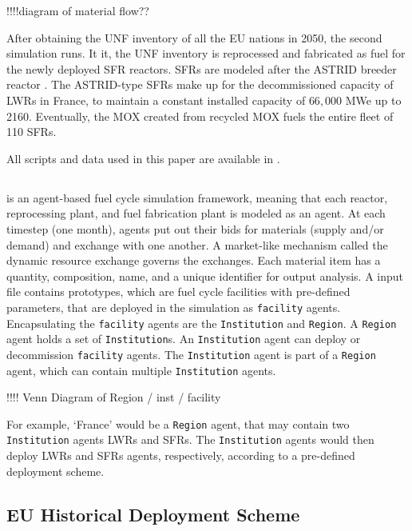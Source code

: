 !!!!diagram of material flow??

After obtaining the \gls{UNF} inventory of all the \gls{EU} nations in 2050, the second
simulation runs. It it, the \gls{UNF} inventory is reprocessed and fabricated
as fuel for the newly deployed \gls{SFR} reactors.
\glspl{SFR} are modeled after the ASTRID breeder reactor \cite{varaine_pre-conceptual_2012}.
The ASTRID-type \glspl{SFR} make up for the decommissioned capacity
of \glspl{LWR} in France, to maintain a constant installed capacity of $66,000$ MWe up to 2160.
Eventually, the  \gls{MOX} created from recycled \gls{MOX}
fuels the entire fleet of 110 \glspl{SFR}.

All scripts and data used
in this paper are available in \cite{bae_arfc/transition-scenarios:_2017}.


\subsection{\Cyclus}
\Cyclus is an agent-based fuel cycle simulation framework, meaning that
each reactor, reprocessing plant, and fuel fabrication plant is modeled as an agent.
At each timestep (one month),
agents put out their bids for materials (supply and/or demand) and exchange
with one another. A market-like mechanism called the dynamic resource exchange
\cite{gidden_agent-based_2015} governs the exchanges.
Each material item has a quantity, composition, name, and a unique identifier
for output analysis. 
A \Cyclus input file contains prototypes, which are fuel cycle facilities with
pre-defined parameters, that are deployed in the simulation as \texttt{facility} agents.
Encapsulating the \texttt{facility} agents are the \texttt{Institution} and \texttt{Region}.
A \texttt{Region} agent holds a set of \texttt{Institution}s. 
An \texttt{Institution} agent can deploy or decommission \texttt{facility} agents.
The \texttt{Institution} agent is part of a \texttt{Region} agent,
which can contain multiple \texttt{Institution} agents.

!!!! Venn Diagram of Region / inst / facility

For example, `France' would be a \texttt{Region} agent,
that may contain two \texttt{Institution} agents \glspl{LWR}
and \glspl{SFR}. The \texttt{Institution} agents would then deploy
\glspl{LWR} and \glspl{SFR} agents, respectively, according to a pre-defined deployment
scheme.


\subsection{\gls{EU} Historical Deployment Scheme}

